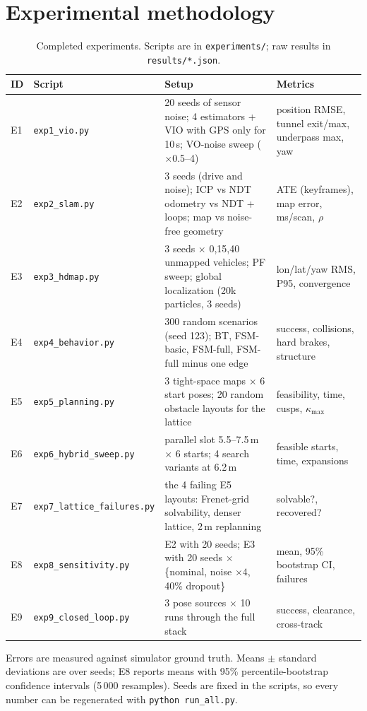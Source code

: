\documentclass[11pt,a4paper]{article}
\begin{document}
\section{Experimental methodology}
\begin{table}[H]\centering\small
\caption{Completed experiments. Scripts are in \texttt{experiments/}; raw results in \texttt{results/*.json}.}
\begin{tabular}{llp{5.2cm}p{3.6cm}}\toprule
ID & Script & Setup & Metrics\\\midrule
E1 & \texttt{exp1\_vio.py} & 20 seeds of sensor noise; 4 estimators + VIO with GPS only for 10\,s; VO-noise sweep ($\times$0.5--4) & position RMSE, tunnel exit/max, underpass max, yaw\\
E2 & \texttt{exp2\_slam.py} & 3 seeds (drive and noise); ICP vs NDT odometry vs NDT + loops; map vs noise-free geometry & ATE (keyframes), map error, ms/scan, $\rho$\\
E3 & \texttt{exp3\_hdmap.py} & 3 seeds $\times$ {0,15,40} unmapped vehicles; PF sweep; global localization (20k particles, 3 seeds) & lon/lat/yaw RMS, P95, convergence\\
E4 & \texttt{exp4\_behavior.py} & 300 random scenarios (seed 123); BT, FSM-basic, FSM-full, FSM-full minus one edge & success, collisions, hard brakes, structure\\
E5 & \texttt{exp5\_planning.py} & 3 tight-space maps $\times$ 6 start poses; 20 random obstacle layouts for the lattice & feasibility, time, cusps, $\kappa_{\max}$\\
E6 & \texttt{exp6\_hybrid\_sweep.py} & parallel slot 5.5--7.5\,m $\times$ 6 starts; 4 search variants at 6.2\,m & feasible starts, time, expansions\\
E7 & \texttt{exp7\_lattice\_failures.py} & the 4 failing E5 layouts: Frenet-grid solvability, denser lattice, 2\,m replanning & solvable?, recovered?\\
E8 & \texttt{exp8\_sensitivity.py} & E2 with 20 seeds; E3 with 20 seeds $\times$ \{nominal, noise $\times4$, 40\% dropout\} & mean, 95\% bootstrap CI, failures\\
E9 & \texttt{exp9\_closed\_loop.py} & 3 pose sources $\times$ 10 runs through the full stack & success, clearance, cross-track\\\bottomrule
\end{tabular}\end{table}
Errors are measured against simulator ground truth. Means $\pm$ standard deviations are over seeds; E8 reports means with 95\% percentile-bootstrap confidence intervals (5\,000 resamples). Seeds are fixed in the scripts, so every number can be regenerated with \texttt{python run\_all.py}.
\end{document}
